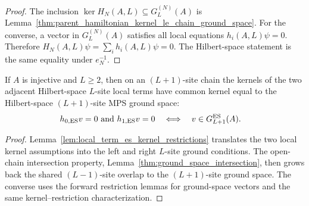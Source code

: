 \begin{proof}
    \leanok
    The inclusion $\ker H_N(A,L)\subseteq G_L^{(N)}(A)$ is
    Lemma~\ref{thm:parent_hamiltonian_kernel_le_chain_ground_space}. For
    the converse, a vector in $G_L^{(N)}(A)$ satisfies all local equations
    $h_i(A,L)\psi=0$. Therefore
    $H_N(A,L)\psi=\sum_i h_i(A,L)\psi=0$.
    The Hilbert-space statement is the same equality under $e_N^{-1}$.
\end{proof}

\begin{lemma}
    \label{thm:adjacent_local_kernels_ground_space_es}
    \leanok
    If $A$ is injective and $L\ge2$, then on an $(L+1)$-site chain the kernels
    of the two adjacent Hilbert-space $L$-site local terms have common kernel
    equal to the Hilbert-space $(L+1)$-site MPS ground space:
    \begin{align}
        h_{0,\mathrm{ES}}v=0\ \text{and}\ h_{1,\mathrm{ES}}v=0
        \quad & \Longleftrightarrow\quad
        v\in G_{L+1}^{\mathrm{ES}}(A). \notag
    \end{align}
\end{lemma}

\begin{proof}
    \leanok
    Lemma~\ref{lem:local_term_es_kernel_restrictions} translates the two local
    kernel assumptions into the left and right $L$-site ground conditions. The
    open-chain intersection property,
    Lemma~\ref{thm:ground_space_intersection}, then grows back the shared
    $(L-1)$-site overlap to the $(L+1)$-site ground space. The converse uses
    the forward restriction lemmas for ground-space vectors and the same
    kernel--restriction characterization.
\end{proof}

